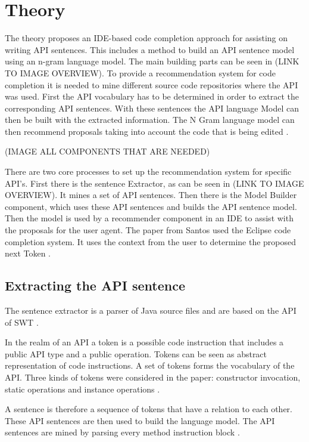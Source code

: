 \section{Theory}
The theory proposes an IDE-based code completion approach for assisting on writing API sentences. This includes a method to build an API sentence model using an n-gram language model. The main building parts can be seen in (LINK TO IMAGE OVERVIEW). 
To provide a recommendation system for code completion it is needed to mine different source code repositories where the API was used. First the API vocabulary has to be determined in order to extract the corresponding API sentences. With these sentences the API language Model can then be built with the extracted information. The N Gram language model can then recommend proposals taking into account the code that is being edited \cite{Santos2017stepwise}. 

(IMAGE ALL COMPONENTS THAT ARE NEEDED)

There are two core processes to set up the recommendation system for specific API's. First there is the sentence Extractor, as can be seen in (LINK TO IMAGE OVERVIEW). It mines a set of API sentences. Then there is the Model Builder component, which uses these API sentences and builds the API sentence model. Then the model is used by a recommender component in an IDE to assist with the proposals for the user agent. The paper from Santos used the Eclipse code completion system. It uses the context from the user to determine the proposed next Token \cite{Santos2017stepwise}. 
\subsection{Extracting the API sentence}
The sentence extractor is a parser of Java source files and are based on the API of SWT \cite{Santos2017stepwise}. 

In the realm of an API a token is a possible code instruction that includes a public API type and a public operation. Tokens can be seen as abstract representation of code instructions. A set of tokens forms the vocabulary of the API. Three kinds of tokens were considered in the paper: constructor invocation, static operations and instance operations \cite{Santos2017stepwise}. 

A sentence is therefore a sequence of tokens that have a relation to each other. These API sentences are then used to build the language model. The API sentences are mined by parsing every method instruction block \cite{Santos2017stepwise}. 

